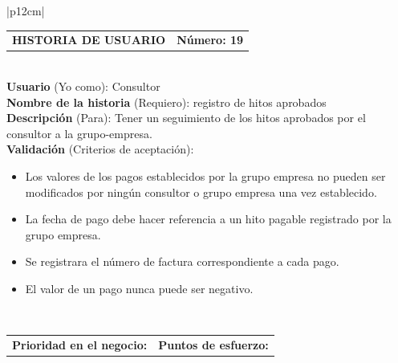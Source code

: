 \documentclass[11pt,letterpaper]{report}
\begin{document}
	\begin{center}	
		\begin{tabular}{|p{12cm}|}
			\hline
			\begin{tabular}{c|c}
				\textbf{HISTORIA DE USUARIO} & \textbf{Número: 19} \\
			\end{tabular} \\ \hline
			\textbf{Usuario} (Yo como): Consultor \\ \hline
			\textbf{Nombre de la historia} (Requiero): registro de hitos aprobados \\ \hline
			\textbf{Descripción} (Para): Tener un seguimiento de los hitos aprobados por el consultor a la grupo-empresa. \\ \hline
			\textbf{Validación} (Criterios de aceptación): \\
			\begin{minipage}{12cm}
				\begin{itemize}
					\item Los valores de los pagos establecidos por la grupo empresa no pueden ser modificados por ningún consultor o grupo empresa una vez establecido.
					\item La fecha de pago debe hacer referencia a un hito pagable registrado por la grupo empresa.
					\item Se registrara el número de factura correspondiente a cada pago.
					\item El valor de un pago nunca puede ser negativo.
				\end{itemize}
			\end{minipage} \\ \hline
			\begin{tabular}{c|c}
				\textbf{Prioridad en el negocio: } & \textbf{Puntos de esfuerzo: } \\
			\end{tabular} \\ \hline
		\end{tabular}
	\end{center}
	
\end{document}

